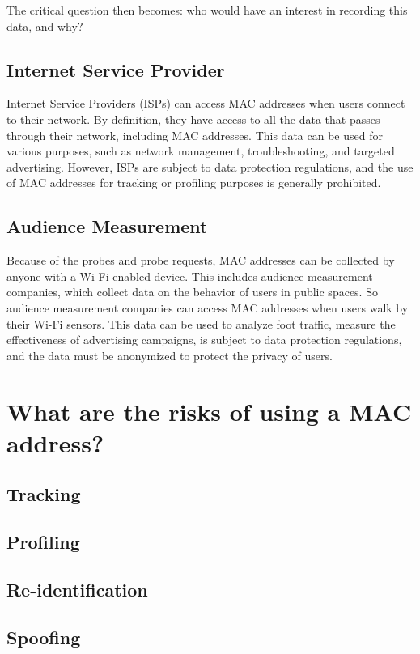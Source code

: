 \documentclass[aps,prb,twocolumn,superscriptaddress,floatfix,longbibliography,nofootinbib]{revtex4-2}
\begin{document}
  The critical question then becomes: who would have an interest in recording this data, and why? 

  \subsection{\label{subsec:ISP}Internet Service Provider}
  Internet Service Providers (ISPs) can access MAC addresses when users connect to their network.
  By definition, they have access to all the data that passes through their network, including MAC addresses.
  This data can be used for various purposes, such as network management, troubleshooting, 
  and targeted advertising. However, ISPs are subject to data protection regulations,
  and the use of MAC addresses for tracking or profiling purposes is generally prohibited.

  \subsection{\label{subsec:Audience}Audience Measurement}
  Because of the probes and probe requests, MAC addresses can be collected by anyone with a Wi-Fi-enabled device.
  This includes audience measurement companies, which collect data on the behavior of users in public spaces.
  So audience measurement companies can access MAC addresses when users walk by their Wi-Fi sensors.
  This data can be used to analyze foot traffic, measure the effectiveness of advertising campaigns,
  is subject to data protection regulations, and the data must be anonymized to protect the privacy of users.


\section{\label{sec:Risks}What are the risks of using a MAC address?}
  \subsection{\label{subsec:Tracking}Tracking}
  \subsection{\label{subsec:Profiling}Profiling}
  \subsection{\label{subsec:Reidentification}Re-identification}
  \subsection{\label{subsec:Spoofing}Spoofing}
\end{document}
